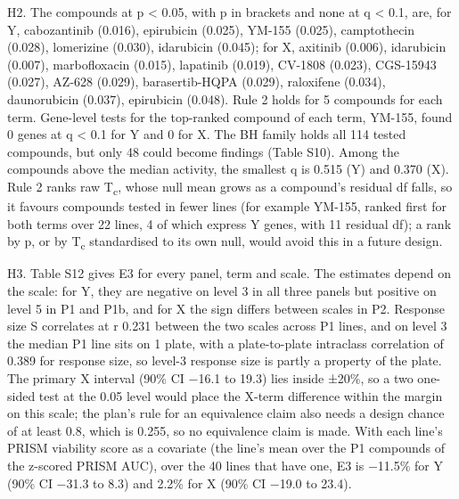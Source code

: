 \documentclass[
  11pt,
  letterpaper,
]{article}
\newcounter{none} %
\begin{document}
H2. The compounds at p \textless{} 0.05, with p in brackets and none at
q \textless{} 0.1, are, for Y, cabozantinib (0.016), epirubicin (0.025),
YM-155 (0.025), camptothecin (0.028), lomerizine (0.030), idarubicin
(0.045); for X, axitinib (0.006), idarubicin (0.007), marbofloxacin
(0.015), lapatinib (0.019), CV-1808 (0.023), CGS-15943 (0.027), AZ-628
(0.029), barasertib-HQPA (0.029), raloxifene (0.034), daunorubicin
(0.037), epirubicin (0.048). Rule 2 holds for 5 compounds for each term.
Gene-level tests for the top-ranked compound of each term, YM-155, found
0 genes at q \textless{} 0.1 for Y and 0 for X. The BH family holds all
114 tested compounds, but only 48 could become findings (Table S10).
Among the compounds above the median activity, the smallest q is 0.515
(Y) and 0.370 (X). Rule 2 ranks raw T\textsubscript{c}, whose null mean
grows as a compound's residual df falls, so it favours compounds tested
in fewer lines (for example YM-155, ranked first for both terms over 22
lines, 4 of which express Y genes, with 11 residual df); a rank by p, or
by T\textsubscript{c} standardised to its own null, would avoid this in
a future design.

H3. Table S12 gives E3 for every panel, term and scale. The estimates
depend on the scale: for Y, they are negative on level 3 in all three
panels but positive on level 5 in P1 and P1b, and for X the sign differs
between scales in P2. Response size S correlates at r 0.231 between the
two scales across P1 lines, and on level 3 the median P1 line sits on 1
plate, with a plate-to-plate intraclass correlation of 0.389 for
response size, so level-3 response size is partly a property of the
plate. The primary X interval (90\% CI −16.1 to 19.3) lies inside ±20\%,
so a two one-sided test at the 0.05 level would place the X-term
difference within the margin on this scale; the plan's rule for an
equivalence claim also needs a design chance of at least 0.8, which is
0.255, so no equivalence claim is made. With each line's PRISM viability
score as a covariate (the line's mean over the P1 compounds of the
z-scored PRISM AUC), over the 40 lines that have one, E3 is −11.5\% for
Y (90\% CI −31.3 to 8.3) and 2.2\% for X (90\% CI −19.0 to 23.4).
\end{document}
